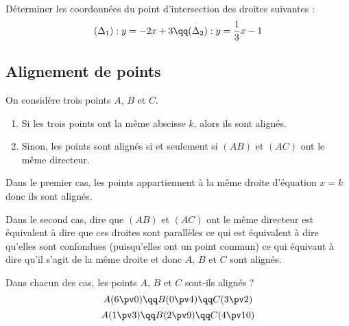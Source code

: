 \documentclass[10pt,openright,twoside,french]{book}
\begin{document}
\begin{Exemple}
Déterminer les coordonnées du point d'intersection des droites suivantes :
\[(\Delta_1) : y = -2x + 3 \qq (\Delta_2) : y = \frac 13 x - 1\]
\end{Exemple}

\subsection{Alignement de points}

\begin{Prop}
    On considère trois points $A$, $B$ et $C$.
    \begin{enumerate}
        \item Si les trois points ont la même abscisse $k$, alors ils sont alignés.
        \item Sinon, les points sont alignés si et seulement si $(AB)$ et $(AC)$ ont le même \coef directeur.
    \end{enumerate}
\end{Prop}

\begin{Demo}
    Dans le premier cas, les points appartiennent à la même droite d'équation $x = k$ donc ils sont alignés.\par
    Dans le second cas, dire que $(AB)$ et $(AC)$ ont le même \coef directeur est équivalent à dire que ces droites sont parallèles ce qui est équivalent à dire qu'elles sont confondues (puisqu'elles ont un point commun) ce qui équivaut à dire qu'il s'agit de la même droite et donc $A$, $B$ et $C$ sont alignés.
\end{Demo}

\begin{Exemple}
    Dans chacun des cas, les points $A$, $B$ et $C$ sont-ils alignés ?
    \[A(6 \pv 0) \qq B(0 \pv 4) \qq C(3 \pv 2)\]\[A(1 \pv 3) \qq B(2 \pv 9) \qq C(4 \pv 10)\]
\end{Exemple}
\end{document}
